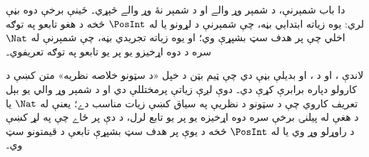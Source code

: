 \documentclass[../../../include/open-logic-chapter]{subfiles}
\begin{document}

\begin{editorial}
دا باب شمېرنې، د شمېر وړ والے او د شمېر نۀ وړ والے څېړي۔
ځينې برخې دوه بڼې لري: يوه زياته ابتدايي بڼه، چې شمېرنې د
لړونو يا له $\PosInt$ څخه د هغو تابعو په توګه اخلي چې پر هدف
سټ بشپړې وي؛ او يوه زياته تجريدي بڼه، چې شمېرنې له $\Nat$ سره
د دوه اړخيزو يو پر يو تابعو په توګه تعريفوي۔
\end{editorial}











\begin{editorial}
لاندې ،
 او 
د ،  او
 بديلې بڼې دي چې ټيم بټن د خپل
«د سټونو خلاصه نظريه» متن کښې د کارولو دپاره برابرې کړې دي۔
دوې لږې زياتې پرمختللې دي او د شمېر وړ والي يو بېل تعريف
کاروي چې د سټونو د نظريې په سياق کښې زيات مناسب دے؛ يعنې
له $\Nat$ يا د هغې له پيلنۍ برخې سره دوه اړخيزه يو پر يو تابع
لرل، د دې پر ځاے چې په لړ کښې د راوړلو وړ وي يا له $\PosInt$
څخه د يوې پر هدف سټ بشپړې تابعې د قيمتونو سټ وي۔
\end{editorial}


\OLEndChapterHook
\end{document}
